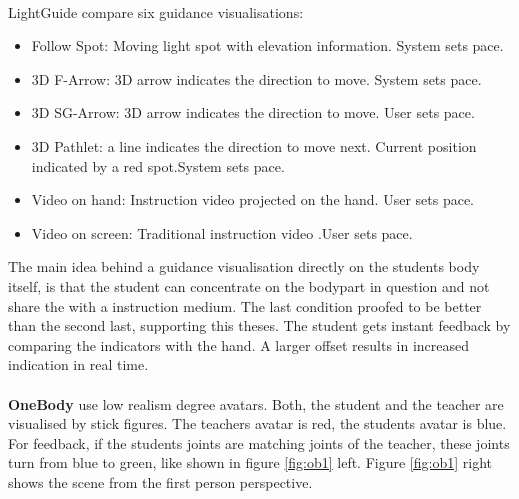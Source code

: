 $ $\\
LightGuide \cite{Sodhi2012} compare six guidance visualisations:
\begin{itemize}
	\item Follow Spot: Moving light spot with elevation information. System sets pace.
	\item 3D F-Arrow: 3D arrow indicates the direction to move. System sets pace.
	\item 3D SG-Arrow: 3D arrow indicates the direction to move. User sets pace.
	\item 3D Pathlet: a line indicates the direction to move next. Current position indicated by a red spot.System sets pace.
	\item Video on hand: Instruction video projected on the hand. User sets pace.
	\item Video on screen: Traditional instruction video .User sets pace.
\end{itemize}
The main idea behind a guidance visualisation directly on the students body itself, is that the student can concentrate on the bodypart in question and not share the  with a instruction medium. The last condition proofed to be better than the second last, supporting this theses.
The student gets instant feedback by comparing the indicators with the hand. A larger offset results in increased indication in real time.\\ \\
\textbf{OneBody} \cite{Hoang2016} use low realism degree avatars. Both, the student and the teacher are visualised by stick figures. The teachers avatar is red, the students avatar is blue. For feedback, if the students joints are matching joints of the teacher, these joints turn from blue to green, like shown in figure \ref{fig:ob1} left. Figure \ref{fig:ob1} right shows the scene from the first person perspective.
